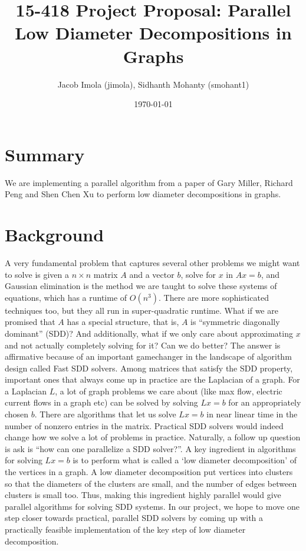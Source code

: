 \documentclass[11pt]{scrartcl}
\theoremstyle{plain}
\theoremstyle{definition}
\theoremstyle{remark}
\begin{document}
\title{15-418 Project Proposal: Parallel Low Diameter Decompositions in Graphs}
\author{\textsf{Jacob Imola (jimola), Sidhanth Mohanty (smohant1)}}
\date{\textsf{\today}}
\maketitle

\section{Summary}
We are implementing a parallel algorithm from a paper of Gary Miller, Richard Peng and Shen Chen Xu to perform low diameter decompositions in graphs. \cite{miller2013parallel}

\section{Background}
A very fundamental problem that captures several other problems we might want to solve is given a $n\times n$ matrix $A$ and a vector $b$, solve for $x$ in $Ax=b$, and Gaussian elimination is the method we are taught to solve these systems of equations, which has a runtime of $O(n^3)$. There are more sophisticated techniques too, but they all run in super-quadratic runtime. What if we are promised that $A$ has a special structure, that is, $A$ is ``symmetric diagonally dominant'' (SDD)? And additionally, what if we only care about approximating $x$ and not actually completely solving for it? Can we do better? The answer is affirmative because of an important gamechanger in the landscape of algorithm design called Fast SDD solvers. Among matrices that satisfy the SDD property, important ones that always come up in practice are the Laplacian of a graph. For a Laplacian $L$, a lot of graph problems we care about (like max flow, electric current flows in a graph etc) can be solved by solving $Lx=b$ for an appropriately chosen $b$. There are algorithms that let us solve $Lx=b$ in near linear time in the number of nonzero entries in the matrix. Practical SDD solvers would indeed change how we solve a lot of problems in practice. Naturally, a follow up question is ask is ``how can one parallelize a SDD solver?''. A key ingredient in algorithms for solving $Lx=b$ is to perform what is called a `low diameter decomposition' of the vertices in a graph. A low diameter decomposition put vertices into clusters so that the diameters of the clusters are small, and the number of edges between clusters is small too. Thus, making this ingredient highly parallel would give parallel algorithms for solving SDD systems. In our project, we hope to move one step closer towards practical, parallel SDD solvers by coming up with a practically feasible implementation of the key step of low diameter decomposition.
\end{document}
